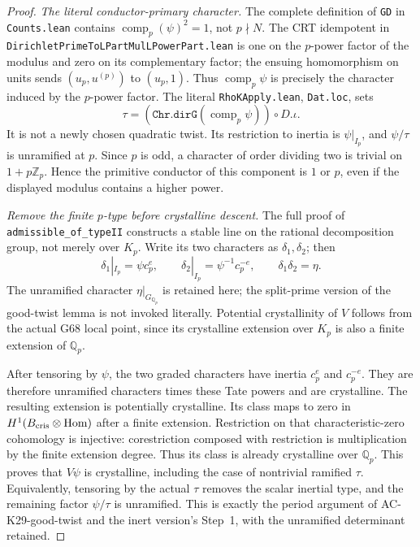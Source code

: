 \begin{proof}
\emph{The literal conductor-primary character.}
The complete definition of \texttt{GD} in \texttt{Counts.lean}
contains $\operatorname{comp}_p(\psi)^2=1$, not $p\nmid N$.
The CRT idempotent in
\texttt{DirichletPrimeToLPartMulLPowerPart.lean} is one on the
$p$-power factor of the modulus and zero on its complementary factor;
the ensuing homomorphism on units sends $(u_p,u^{(p)})$ to $(u_p,1)$.
Thus $\operatorname{comp}_p\psi$ is precisely the character induced
by the $p$-power factor.  The literal \texttt{RhoKApply.lean},
\texttt{Dat.loc}, sets
\[
 \tau=(\texttt{Chr.dirG}(\operatorname{comp}_p\psi))\circ D.\iota.
\]
It is not a newly chosen quadratic twist.  Its restriction to inertia
is $\psi|_{I_p}$, and $\psi/\tau$ is unramified at $p$.
Since $p$ is odd, a character of order dividing two is trivial on
$1+p\mathbb Z_p$.  Hence the primitive conductor of this component is
$1$ or $p$, even if the displayed modulus contains a higher power.

\emph{Remove the finite $p$-type before crystalline descent.}
The full proof of \texttt{admissible\_of\_typeII} constructs a stable
line on the rational decomposition group, not merely over $K_p$.
Write its two characters as $\delta_1,\delta_2$; then
\[
 \delta_1|_{I_p}=\psi c_p^e,\qquad
 \delta_2|_{I_p}=\psi^{-1}c_p^{-e},\qquad
 \delta_1\delta_2=\eta.
\]
The unramified character $\eta|_{G_{\mathbb Q_p}}$ is retained here;
the split-prime version of the good-twist lemma is not invoked
literally.  Potential crystallinity of $V$ follows from the actual
G68 local point, since its crystalline extension over $K_p$ is also a
finite extension of $\mathbb Q_p$.

After tensoring by $\psi$, the two graded characters have inertia
$c_p^e$ and $c_p^{-e}$.  They are therefore unramified characters
times these Tate powers and are crystalline.  The resulting extension
is potentially crystalline.  Its class maps to zero in
$H^1(B_{\rm cris}\otimes\operatorname{Hom})$ after a finite extension.
Restriction on that characteristic-zero cohomology is injective:
corestriction composed with restriction is multiplication by the
finite extension degree.  Thus its class is already crystalline over
$\mathbb Q_p$.  This proves that $V\psi$ is crystalline, including
the case of nontrivial ramified $\tau$.
Equivalently, tensoring by the actual $\tau$ removes the scalar
inertial type, and the remaining factor $\psi/\tau$ is unramified.
This is exactly the period argument of AC-K29-good-twist and the
inert version's Step~1, with the unramified determinant retained.


\end{proof}
